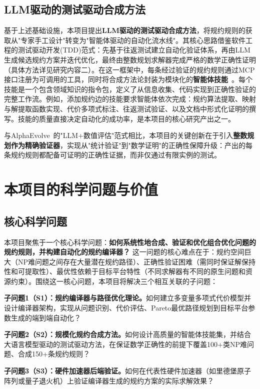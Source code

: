 \subsection{ LLM驱动的测试驱动合成方法}

基于上述基础设施，本项目提出\textbf{LLM驱动的测试驱动合成方法}，将规约规则的获取从"专家手工设计"转变为"智能体驱动的自动化流水线"。其核心思路借鉴软件工程的测试驱动开发(TDD)范式：先基于往返测试建立自动化验证体系，再由LLM生成候选规约方案并迭代优化，最终由整数规划求解器完成严格的数学正确性证明（具体方法详见研究内容二）。在这一框架中，每条经过验证的规约规则通过MCP接口注册为可调用的工具，同时将合成方法论封装为模块化的\textbf{智能体技能}~\cite{AgentSkills2025}。每个技能是一个包含领域知识的指令包，定义了从信息收集、代码实现到正确性验证的完整工作流。例如，添加规约边的技能要求智能体依次完成：规约算法提取、映射与解提取函数实现、代价多项式标注、往返测试验证、以及文档中形式化证明的撰写。技能的质量直接决定自动化的成功率，是本项目的核心研究产出之一。

与AlphaEvolve~\cite{AlphaEvolve2025}的"LLM+数值评估"范式相比，本项目的关键创新在于引入\textbf{整数规划作为精确验证器}，实现从"统计验证"到"数学证明"的正确性保障升级：产出的每条规约规则都配备可证明的正确性证据，而非仅通过有限实例的测试。


\section{本项目的科学问题与价值}

\subsection{核心科学问题}

本项目聚焦于一个核心科学问题：\textbf{如何系统性地合成、验证和优化组合优化问题的规约规则，并构建自动化的规约编译器？}
这一问题的核心难点在于：规约空间巨大（NP难问题之间存在大量潜在规约路径）、正确性验证困难（需同时保证解保持性和可提取性）、最优性依赖于目标平台特性（不同求解器有不同的原生问题和资源约束）。围绕这一核心问题，本项目将解决三个相互关联的子问题：

\textbf{子问题1（S1）：规约编译器与路径优化理论。}如何建立多变量多项式代价模型并设计编译器架构，实现从问题识别、代价评估、Pareto最优路径规划到目标平台参数生成的端到端自动化？

\textbf{子问题2（S2）：规模化规约合成方法。}如何设计高质量的智能体技能集，并结合大语言模型驱动的测试驱动方法，在保证数学正确性的前提下覆盖100+类NP难问题、合成150+条规约规则？

\textbf{子问题3（S3）：硬件加速器后端验证。}如何在代表性硬件加速器（如里德堡原子阵列或量子退火机）上验证编译器生成的规约方案的实际求解效果？

